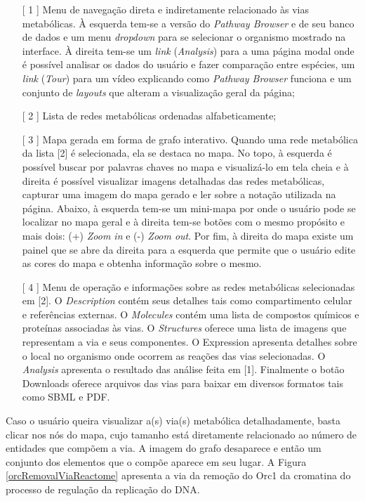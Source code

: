 \begin{itemize}
\item[[ 1]] Menu de navegação direta e indiretamente relacionado às vias metabólicas. À esquerda tem-se a versão do \textit{Pathway Browser} e de seu banco de dados e um menu \textit{dropdown} para se selecionar o organismo mostrado na interface. À direita tem-se um \textit{link} (\textit{Analysis}) para a uma página modal onde é possível analisar os dados do usuário e fazer comparação entre espécies, um \textit{link} (\textit{Tour}) para um vídeo explicando como \textit{Pathway Browser} funciona e um conjunto de \textit{layouts} que alteram a visualização geral da página;
\item[[ 2]] Lista de redes metabólicas ordenadas alfabeticamente;
\item[[ 3]] Mapa gerada em forma de grafo interativo. Quando uma rede metabólica da lista [2] é selecionada, ela se destaca no mapa. No topo, à esquerda é possível buscar por palavras chaves no mapa e visualizá-lo em tela cheia e à direita é possível visualizar imagens detalhadas das redes metabólicas, capturar uma imagem do mapa gerado e ler sobre a notação utilizada na página. Abaixo, à esquerda tem-se um mini-mapa por onde o usuário pode se localizar no mapa geral e à direita tem-se botões com o mesmo propósito e mais dois: (+) \textit{Zoom in} e (-) \textit{Zoom out}. Por fim, à direita do mapa existe um painel que se abre da direita para a esquerda que permite que o usuário edite as cores do mapa e obtenha informação sobre o mesmo.
\item[[ 4]] Menu de operação e informações sobre as redes metabólicas selecionadas em [2]. O \textit{Description} contém seus detalhes tais como compartimento celular e referências externas. O \textit{Molecules} contém uma lista de compostos químicos e proteínas associadas às vias. O \textit{Structures} oferece uma lista de imagens que representam a via e seus componentes. O Expression apresenta detalhes sobre o local no organismo onde ocorrem as reações das vias selecionadas. O \textit{Analysis} apresenta o resultado das análise feita em [1]. Finalmente o botão Downloads oferece arquivos das vias para baixar em diversos formatos tais como SBML e PDF. 
\end{itemize}

\indent Caso o usuário queira visualizar a(s) via(s) metabólica detalhadamente, basta clicar nos nós do mapa, cujo tamanho está diretamente relacionado ao número de entidades que compõem a via. A imagem do grafo desaparece e então um conjunto dos elementos que o compõe aparece em seu lugar. A Figura \ref{orcRemovalViaReactome} apresenta a via da remoção do Orc1 da cromatina do processo de regulação da replicação do DNA.

